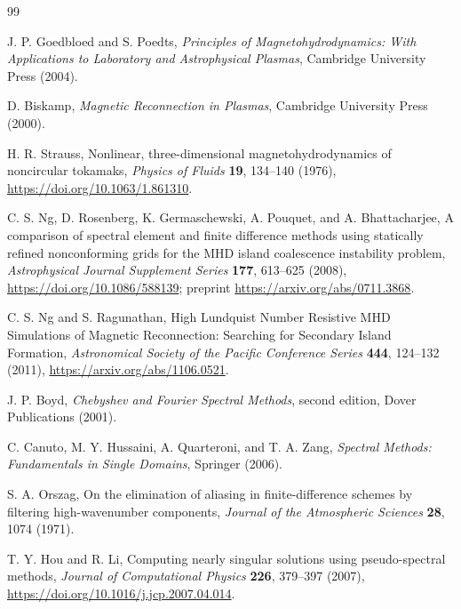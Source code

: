 \documentclass[11pt]{article}
\begin{document}
\clearpage
\begin{thebibliography}{99}

J. P. Goedbloed and S. Poedts,
\emph{Principles of Magnetohydrodynamics: With Applications to Laboratory and Astrophysical Plasmas},
Cambridge University Press (2004).

D. Biskamp,
\emph{Magnetic Reconnection in Plasmas},
Cambridge University Press (2000).

H. R. Strauss,
Nonlinear, three-dimensional magnetohydrodynamics of noncircular tokamaks,
\emph{Physics of Fluids} \textbf{19}, 134--140 (1976),
\url{https://doi.org/10.1063/1.861310}.

C. S. Ng, D. Rosenberg, K. Germaschewski, A. Pouquet, and A. Bhattacharjee,
A comparison of spectral element and finite difference methods using statically refined nonconforming grids for the MHD island coalescence instability problem,
\emph{Astrophysical Journal Supplement Series} \textbf{177}, 613--625 (2008),
\url{https://doi.org/10.1086/588139};
preprint \url{https://arxiv.org/abs/0711.3868}.

C. S. Ng and S. Ragunathan,
High Lundquist Number Resistive MHD Simulations of Magnetic Reconnection: Searching for Secondary Island Formation,
\emph{Astronomical Society of the Pacific Conference Series} \textbf{444}, 124--132 (2011),
\url{https://arxiv.org/abs/1106.0521}.

J. P. Boyd,
\emph{Chebyshev and Fourier Spectral Methods},
second edition, Dover Publications (2001).

C. Canuto, M. Y. Hussaini, A. Quarteroni, and T. A. Zang,
\emph{Spectral Methods: Fundamentals in Single Domains},
Springer (2006).

S. A. Orszag,
On the elimination of aliasing in finite-difference schemes by filtering high-wavenumber components,
\emph{Journal of the Atmospheric Sciences} \textbf{28}, 1074 (1971).

T. Y. Hou and R. Li,
Computing nearly singular solutions using pseudo-spectral methods,
\emph{Journal of Computational Physics} \textbf{226}, 379--397 (2007),
\url{https://doi.org/10.1016/j.jcp.2007.04.014}.

\end{thebibliography}
\end{document}
